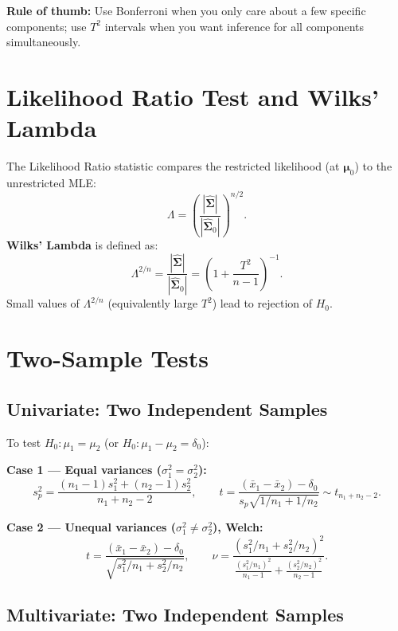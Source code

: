 \documentclass[12pt, a4paper]{article}
\newcommand{\xbar}{\bar{x}}
\newcommand{\muv}{\boldsymbol{\mu}}
\newcommand{\Sig}{\boldsymbol{\Sigma}}
\begin{document}
\textbf{Rule of thumb:} Use Bonferroni when you only care about a few specific components; use $T^2$ intervals when you want inference for all components simultaneously.

\section{Likelihood Ratio Test and Wilks' Lambda}

The Likelihood Ratio statistic compares the restricted likelihood (at $\muv_0$) to the unrestricted MLE:
\[
  \Lambda = \left(\frac{|\hat{\Sig}|}{|\hat{\Sig}_0|}\right)^{n/2}.
\]
\textbf{Wilks' Lambda} is defined as:
\[
  \Lambda^{2/n} = \frac{|\hat{\Sig}|}{|\hat{\Sig}_0|} = \left(1 + \frac{T^2}{n-1}\right)^{-1}.
\]
Small values of $\Lambda^{2/n}$ (equivalently large $T^2$) lead to rejection of $H_0$.

\section{Two-Sample Tests}

\subsection{Univariate: Two Independent Samples}

To test $H_0: \mu_1 = \mu_2$ (or $H_0: \mu_1 - \mu_2 = \delta_0$):

\medskip
\textbf{Case 1 — Equal variances ($\sigma_1^2 = \sigma_2^2$):}
\[
  s_p^2 = \frac{(n_1-1)s_1^2+(n_2-1)s_2^2}{n_1+n_2-2}, \qquad
  t = \frac{(\xbar_1-\xbar_2)-\delta_0}{s_p\sqrt{1/n_1+1/n_2}} \sim t_{n_1+n_2-2}.
\]

\textbf{Case 2 — Unequal variances ($\sigma_1^2 \neq \sigma_2^2$), Welch:}
\[
  t = \frac{(\xbar_1-\xbar_2)-\delta_0}{\sqrt{s_1^2/n_1+s_2^2/n_2}}, \qquad
  \nu = \frac{(s_1^2/n_1+s_2^2/n_2)^2}{\frac{(s_1^2/n_1)^2}{n_1-1}+\frac{(s_2^2/n_2)^2}{n_2-1}}.
\]

\subsection{Multivariate: Two Independent Samples}
\end{document}
